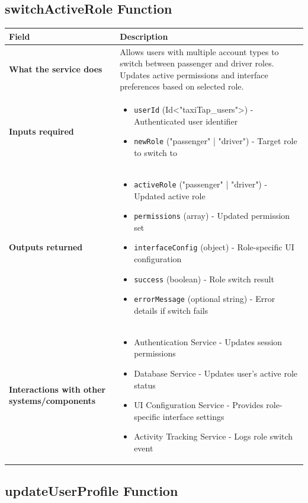 \documentclass[11pt,a4paper]{article}
\begin{document}
\subsection{switchActiveRole Function}

\begin{longtable}{|p{4cm}|p{12cm}|}
\hline
\textbf{Field} & \textbf{Description} \\
\hline
\textbf{What the service does} & 
Allows users with multiple account types to switch between passenger and driver roles. Updates active permissions and interface preferences based on selected role. \\
\hline
\textbf{Inputs required} & 
\begin{itemize}[nosep]
\item \texttt{userId} (Id<"taxiTap\_users">) - Authenticated user identifier
\item \texttt{newRole} ("passenger" | "driver") - Target role to switch to
\end{itemize} \\
\hline
\textbf{Outputs returned} & 
\begin{itemize}[nosep]
\item \texttt{activeRole} ("passenger" | "driver") - Updated active role
\item \texttt{permissions} (array) - Updated permission set
\item \texttt{interfaceConfig} (object) - Role-specific UI configuration
\item \texttt{success} (boolean) - Role switch result
\item \texttt{errorMessage} (optional string) - Error details if switch fails
\end{itemize} \\
\hline
\textbf{Interactions with other systems/components} & 
\begin{itemize}[nosep]
\item Authentication Service - Updates session permissions
\item Database Service - Updates user's active role status
\item UI Configuration Service - Provides role-specific interface settings
\item Activity Tracking Service - Logs role switch event
\end{itemize} \\
\hline
\end{longtable}

\subsection{updateUserProfile Function}
\end{document}
